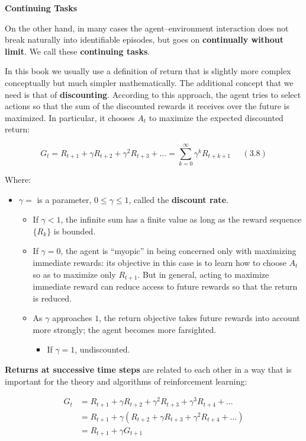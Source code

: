 \documentclass[12pt, a4paper]{article}
\begin{document}
\textbf{Continuing Tasks}\label{continuing-tasks}


On the other hand, in many cases the agent--environment interaction does
not break naturally into identifiable episodes, but goes on
\textbf{continually without limit}. We call these \textbf{continuing
tasks}.

In this book we usually use a definition of return that is slightly more
complex conceptually but much simpler mathematically. The additional
concept that we need is that of \textbf{discounting}. According to this
approach, the agent tries to select actions so that the sum of the
discounted rewards it receives over the future is maximized. In
particular, it chooses \(A_t\) to maximize the expected discounted
return:

\[G_t = R_{t+1} + \gamma R_{t+2} + \gamma^2 R_{t+3} + ... = \sum_{k=0}^{\infty} \gamma^k R_{t+k+1} \;\;\;\;\;(3.8)\]

Where:

\begin{itemize}
\item
  \(\gamma =\) is a parameter, \(0 \leq \gamma \leq 1\), called the
  \textbf{discount rate}.

  \begin{itemize}
  \item
    If \(\gamma < 1\), the infinite sum has a finite value as long as
    the reward sequence \(\{R_k\}\) is bounded.
  \item
    If \(\gamma = 0\), the agent is ``myopic'' in being concerned only
    with maximizing immediate rewards: its objective in this case is to
    learn how to choose \(A_t\) so as to maximize only \(R_{t+1}\). But
    in general, acting to maximize immediate reward can reduce access to
    future rewards so that the return is reduced.
  \item
    As \(\gamma\) approaches \(1\), the return objective takes future
    rewards into account more strongly; the agent becomes more
    farsighted.
    \begin{itemize}
      \item If $\gamma = 1$, undiscounted.
    \end{itemize}
  \end{itemize}
\end{itemize}

\textbf{Returns at successive time steps} are related to each other in a
way that is important for the theory and algorithms of reinforcement
learning:

\begin{align*}
  G_t &= R_{t+1} + \gamma R_{t+2} + \gamma^2 R_{t+3} + \gamma^3 R_{t+4} + ... \\
  &= R_{t+1} + \gamma (R_{t+2} + \gamma R_{t+3} + \gamma^2 R_{t+4} + ...)  \\
  &= R_{t+1} + \gamma G_{t+1} \\
\end{align*}
\end{document}
